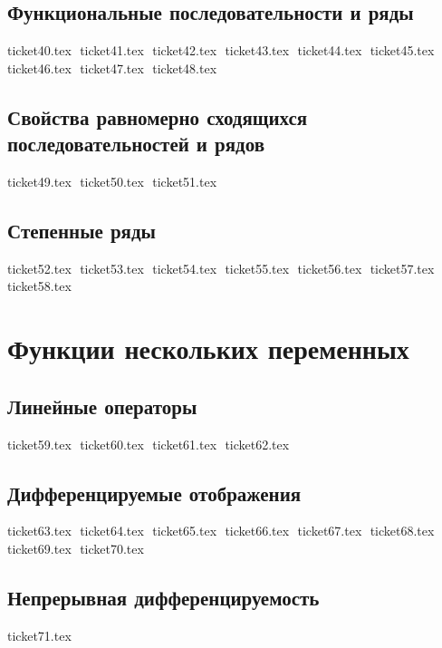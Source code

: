 \section{Функциональные последовательности и ряды}
{ticket40.tex}
$ $
{ticket41.tex}
$ $
{ticket42.tex}
$ $
{ticket43.tex}
$ $
{ticket44.tex}
$ $
{ticket45.tex}
$ $
{ticket46.tex}
$ $
{ticket47.tex}
$ $
{ticket48.tex}
$ $

\section{Свойства равномерно сходящихся последовательностей и рядов}
{ticket49.tex}
$ $
{ticket50.tex}
$ $
{ticket51.tex}
$ $

\section{Степенные ряды}
{ticket52.tex}
$ $
{ticket53.tex}
$ $
{ticket54.tex}
$ $
{ticket55.tex}
$ $
{ticket56.tex}
$ $
{ticket57.tex}
$ $
{ticket58.tex}
$ $

\chapter{Функции нескольких переменных}
\section{Линейные операторы}
{ticket59.tex}
$ $
{ticket60.tex}
$ $
{ticket61.tex}
$ $
{ticket62.tex}
$ $

\section{Дифференцируемые отображения}
{ticket63.tex}
$ $
{ticket64.tex}
$ $
{ticket65.tex}
$ $
{ticket66.tex}
$ $
{ticket67.tex}
$ $
{ticket68.tex}
$ $
{ticket69.tex}
$ $
{ticket70.tex}
$ $

\section{Непрерывная дифференцируемость}
{ticket71.tex}
$ $

